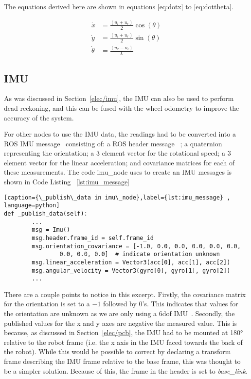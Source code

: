 The equations derived here are shown in equations \ref{eq:dotx} to \ref{eq:dottheta}.


\begin{align}
\dot{x} & = \frac{(u_l + u_r)}{2} \cos(\theta) \label{eq:dotx} \\
\dot{y} & = \frac{(u_l + u_r)}{2} \sin(\theta) \label{eq:doty} \\
\dot{\theta} & = \frac{(u_r - u_l)}{L} \label{eq:dottheta}
\end{align}

\subsection{IMU}\label{soft/odometry/imu}

As was discussed in Section~\ref{elec/imu}, the IMU can also be used to 
perform dead reckoning, and this can be fused with the wheel odometry to 
improve the accuracy of the system.


For other nodes to use the IMU data, the readings had to be converted into 
a ROS IMU message~\cite{ROSIMUMsg} consisting of: a ROS header message~
\cite{ROSHeaderMsg}; a quaternion representing the orientation; a 3 
element vector for the rotational speed; a 3 element vector for the linear 
acceleration; and covariance matrices for each of these measurements. The 
code imu\_node uses to create an IMU messages is shown in Code Listing~
\ref{lst:imu_message}


\begin{lstlisting}[caption={\_publish\_data in imu\_node},label={lst:imu_message} , language=python]
def _publish_data(self):
        ...
        msg = Imu()
        msg.header.frame_id = self.frame_id
        msg.orientation_covariance = [-1.0, 0.0, 0.0, 0.0, 0.0, 0.0,
                0.0, 0.0, 0.0]  # indicate orientation unknown
        msg.linear_acceleration = Vector3(acc[0], acc[1], acc[2])
        msg.angular_velocity = Vector3(gyro[0], gyro[1], gyro[2])
        ...
\end{lstlisting}
There are a couple points to notice in this excerpt. Firstly, the 
covariance matrix for the orientation is set to a $-1$ followed by 0's. 
This indicates that values for the orientation are unknown as we are only 
using a 6dof IMU~\cite{ROSIMUMsg}. Secondly, the published values for the 
x and y axes are negative the measured value. This is because, as 
discussed in Section~\ref{elec/pcb}, the IMU had to be mounted at 
\ang{180} relative to the robot frame (i.e. the x axis in the IMU faced 
towards the back of the robot). While this would be possible to correct by 
declaring a transform frame describing the IMU frame relative to the base 
frame, this was thought to be a simpler solution. Because of this, the 
frame in the header is set to \textit{base\_link}.

